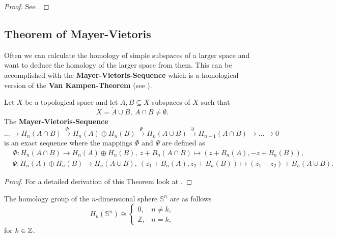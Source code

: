 \begin{proof}
  See \cite[Chapter 3.1]{hatcher}.
\end{proof}

\subsection{Theorem of Mayer-Vietoris}
Often we can calculate the homology of simple subspaces of a larger space and want to deduce the homology of the larger space from them.
This can be accomplished with the \textbf{Mayer-Vietoris-Sequence} which is a homological version of the \textbf{Van Kampen-Theorem} (see \cite[Chapter 1.2]{hatcher}).

\begin{thm}\label{thm:mvs}
  Let $X$ be a topological space and let $A, B \subseteq X$ subspaces of $X$ such that \[X = \dot{A} \cup \dot{B}, \: A \cap B \neq \emptyset.\]
  The \textbf{Mayer-Vietoris-Sequence}
  \begin{equation*}
    \ldots \to H_n(A\cap B) \overset{\Phi}{\to} H_n(A) \oplus H_n(B) \overset{\Psi}{\to} H_n(A \cup B) \overset{\partial}{\to} H_{n-1}(A\cap B) \to \ldots \to 0
  \end{equation*}
  is an exact sequence where the mappings $\Phi$ and $\Psi$ are defined as
  \begin{align*}
    &\Phi\colon H_n(A\cap B) \to H_n(A) \oplus H_n(B),\: z + B_n(A\cap B) \mapsto (z+B_n(A), -z + B_n(B)), \\
    &\Psi\colon H_n(A) \oplus H_n(B) \to H_n(A\cup B), \: (z_1+ B_n(A), z_2 + B_n(B)) \mapsto (z_1 + z_2) + B_n(A \cup B).
  \end{align*}
\end{thm}

\begin{proof}
  For a detailed derivation of this Theorem look at \cite[p. 149]{hatcher}. 
\end{proof}

\begin{ex}
  The homology group of the $n$-dimensional sphere $\mathbb{S}^n$ are as follows
  \begin{equation*}
    H_k(\mathbb{S}^n) \cong \begin{cases}
      0, &n \neq k, \\
      \mathbb{Z}, &n = k,
    \end{cases}
  \end{equation*}
  for $k \in \mathbb{Z}$.
\end{ex}

